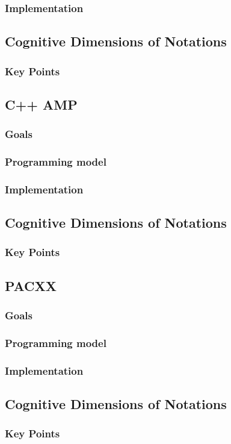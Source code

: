 \subsubsection{Implementation}

\subsection{Cognitive Dimensions of Notations}

\subsubsection{Key Points}


\subsection{C++ AMP}

\subsubsection{Goals}

\subsubsection{Programming model}

\subsubsection{Implementation}

\subsection{Cognitive Dimensions of Notations}

\subsubsection{Key Points}


\subsection{PACXX}

\subsubsection{Goals}

\subsubsection{Programming model}

\subsubsection{Implementation}

\subsection{Cognitive Dimensions of Notations}

\subsubsection{Key Points}